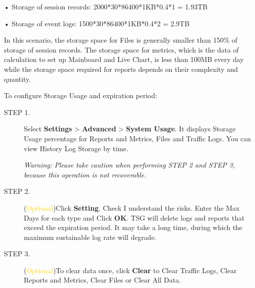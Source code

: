 • Storage of session records: 2000*30*86400*1KB*0.4*1 = 1.93TB


• Storage of event logs: 1500*30*86400*1KB*0.4*2 = 2.9TB


In this scenario, the storage space for Files is generally smaller than 150\% of storage of session records. The storage space for metrics, which is the data of calculation to set up Mainboard and Live Chart, is less than 100MB every day while the storage space required for reports depends on their complexity and quantity.


To configure Storage Usage and expiration period:

\begin{description}
    \item[STEP 1.]	Select \textbf{Settings} > \textbf{Advanced} > \textbf{System Usage}. It displays Storage Usage percentage for Reports and Metrics, Files and Traffic Logs. You can view History Log Storage by time.


\warnmark\textit{Warning: Please take caution when performing STEP 2 and STEP 3, because this operation is not recoverable.}
    \item[STEP 2.]	(\textcolor{gold}{Optional})Click \textbf{Setting}. Check \CheckedBox  I understand the risks. Enter the Max Days for each type and Click \textbf{OK}. TSG will delete logs and reports that exceed the expiration period. It may take a long time, during which the maximum sustainable log rate will degrade.
    \item[STEP 3.]	(\textcolor{gold}{Optional})To clear data once, click \textbf{Clear} to Clear Traffic Logs, Clear Reports and Metrics, Clear Files or Clear All Data.
\end{description} 